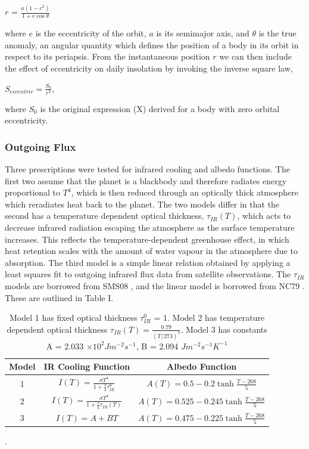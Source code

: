 \documentclass[12pt,onecolumn]{revtex4-2}    %
\begin{document}
\begin{center}
$r$ = $\frac{a(1-e^{2})}{1 + e \cos \theta}$
\end{center}

where $e$ is the eccentricity of the orbit, $a$ is its semimajor axis, and $\theta$ is the true anomaly, an angular quantity which defines the position of a body in its orbit in respect to its periapsis. From the instantaneous position $r$ we can then include the effect of eccentricity on daily insolation by invoking the inverse square law,

\begin{center}
$S_{eccentric} = \frac{S_{0}}{r^{2}},$
\end{center}

where $S_{0}$ is the original expression (X) derived for a body with zero orbital eccentricity.

\subsubsection{Outgoing Flux}
Three prescriptions were tested for infrared cooling and albedo functions. The first two assume that the planet is a blackbody and therefore radiates energy proportional to $T^{4}$, which is then reduced through an optically thick atmosphere which reradiates heat back to the planet. The two models differ in that the second has a temperature dependent optical thickness, $\tau_{IR}(T)$, which acts to decrease infrared radiation escaping the atmosphere as the surface temperature increases. This reflects the temperature-dependent greenhouse effect, in which heat retention scales with the amount of water vapour in the atmosphere due to absorption. The third model is a simple linear relation obtained by applying a least squares fit to outgoing infrared flux data from satellite observations. The $\tau_{IR}$ models are borrowed from SMS08 \cite{SMS08}, and the linear model is borrowed from NC79 \cite{NC79}. These are outlined in Table I. 
\\
\begin{table}
\begin{tabular}{ccc} \toprule
    Model & IR Cooling Function & Albedo Function \\ \midrule
    1  & $I(T) = \frac{\sigma T^{4}}{1+ \frac{3}{4}\tau_{IR}^{0}}$ & $A(T) = 0.5 - 0.2 \tanh \frac{T - 268}{5}$ \\
    2  & $I(T) = \frac{\sigma T^{4}}{1+ \frac{3}{4}\tau_{IR}(T)}$  & $A(T) = 0.525 - 0.245 \tanh \frac{T - 268}{5}$ \\
    3  & $I(T) = A + BT $  & $A(T) = 0.475 - 0.225 \tanh \frac{T - 268}{5}$ \\
\bottomrule
\end{tabular}
\caption{Model 1 has fixed optical thickness $\tau_{IR}^{0}$ = 1. Model 2 has temperature dependent optical thickness $\tau_{IR}(T) = \frac{0.79}{(T/273)^{3}}$. Model 3 has constants A = 2.033 $\times 10^{2} Jm^{-2}s^{-1}$, B = 2.094 $J m^{-2} s^{-1} K^{-1}$}.
\end{table}
\end{document}
